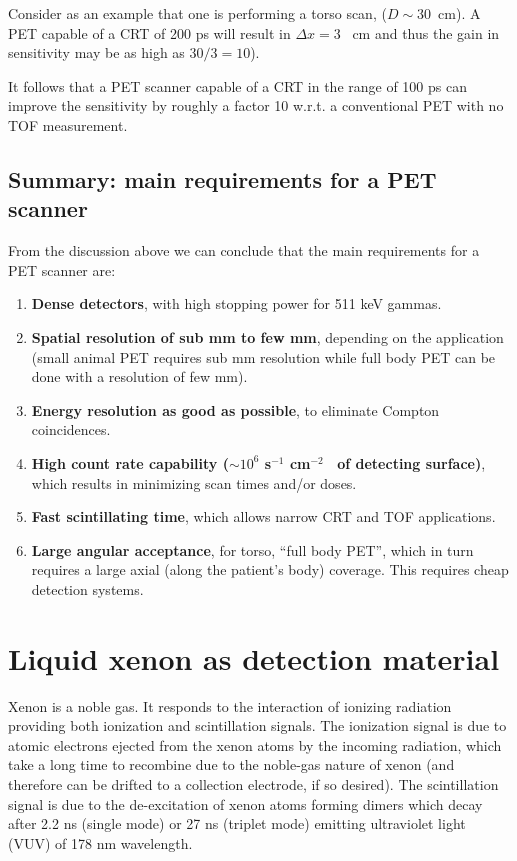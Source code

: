 \documentclass[review]{elsarticle}
\begin{document}
Consider as an example that one is performing a torso scan, ($D \sim 30$~cm). A PET capable of a CRT of 200 ps will result in $\Delta x = 3$~ cm and thus the gain in sensitivity may be as high as $30/3 = 10$). 
  
It follows that a PET scanner capable of a CRT in the range of 100 ps can improve the sensitivity by roughly a factor 10 w.r.t. a conventional PET with no TOF measurement. 


\subsection*{Summary: main requirements for a PET scanner}

From the discussion above we can conclude that the 
main requirements for a PET scanner are: 

\begin{enumerate}
\item {\bf Dense detectors}, with high stopping power for 511 keV gammas.
\item {\bf Spatial resolution of sub mm to few mm}, depending on the application (small animal PET requires sub mm resolution while full body PET can be done with a resolution of few mm).
\item {\bf Energy resolution as good as possible}, to eliminate Compton coincidences.
\item {\bf High count rate capability ($\sim10^6$ s$^{-1}$ cm$^{-2}$~ of detecting surface)}, which results in minimizing scan times and/or doses.
\item {\bf Fast scintillating time}, which allows narrow CRT and TOF applications. 
\item {\bf Large angular acceptance}, for torso, ``full body PET'', which in turn requires a large axial (along the patient's body) coverage. This requires cheap detection systems. 
\end{enumerate}


\section{Liquid xenon as detection material}\label{sec.LXe}

%

Xenon is a noble gas. It responds to the interaction of ionizing radiation providing both ionization and scintillation signals. The ionization signal is due to atomic electrons ejected from the xenon atoms by the incoming radiation, which take a long time to recombine due to the noble-gas nature of xenon (and therefore can be drifted to a collection electrode, if so desired). The scintillation signal is due to the de-excitation of xenon atoms forming dimers which decay after 2.2 ns (single mode) or 27 ns (triplet mode) emitting ultraviolet light (VUV) of 178 nm wavelength.
\end{document}
